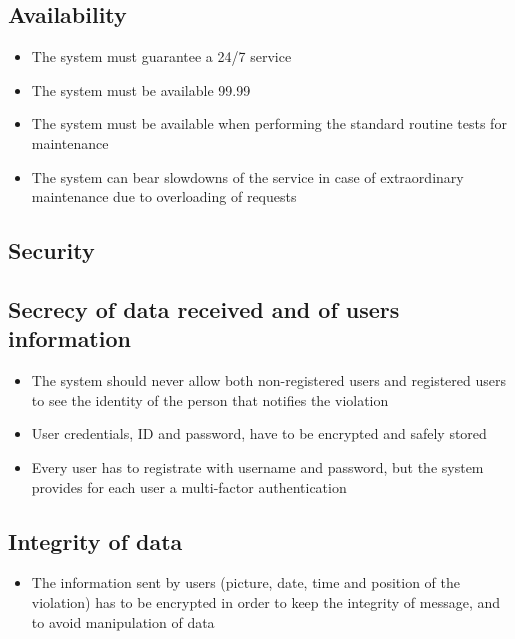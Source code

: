 \subsection{Availability}
\begin{itemize}
    \item The system must guarantee a 24/7 service
    \item The system must be available 99.99%
    \item The system must be available when performing the standard routine tests for maintenance
    \item The system can bear slowdowns of the service in case of extraordinary maintenance due to overloading of requests
\end{itemize}

\subsection{Security}
\subsection{Secrecy of data received and of users information}
\begin{itemize}
    \item The system should never allow both non-registered users and registered users to see the identity of the person that notifies the violation
    \item User credentials, ID and password, have to be encrypted and safely stored
    \item Every user has to registrate with username and password, but the system provides for each user a multi-factor authentication
\end{itemize}

\subsection{Integrity of data}
\begin{itemize}
    \item The information sent by users (picture, date, time and position of the violation) has to be encrypted in order to keep the integrity of message, and to avoid manipulation of data
\end{itemize}

